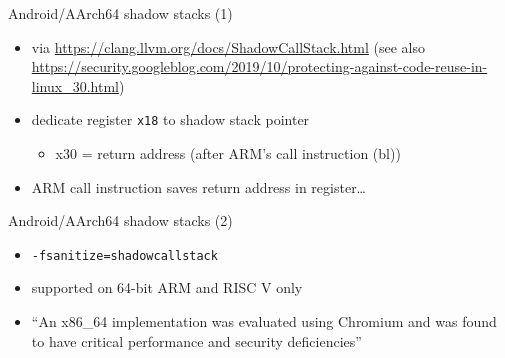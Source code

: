 \begin{frame}[fragile,label=actShadowStack]{Android/AArch64 shadow stacks (1)}
   \begin{itemize}
    \item {\tiny via \url{https://clang.llvm.org/docs/ShadowCallStack.html} (see also {\url{https://security.googleblog.com/2019/10/protecting-against-code-reuse-in-linux_30.html}})}
    \item dedicate register \texttt{x18} to shadow stack pointer
        \begin{itemize}
        \item x30 = return address (after ARM's call instruction (bl))
        \end{itemize}
    \item ARM call instruction saves return address in register\ldots
    \end{itemize}
\end{frame}

\begin{frame}{Android/AArch64 shadow stacks (2)}
    \begin{itemize}
    \item \texttt{-fsanitize=shadowcallstack}
    \item supported on 64-bit ARM and RISC V only
    \vspace{.5cm}
    \item ``An x86\_64 implementation was evaluated using Chromium and was found to have critical performance and security deficiencies''
    \end{itemize}
\end{frame}
